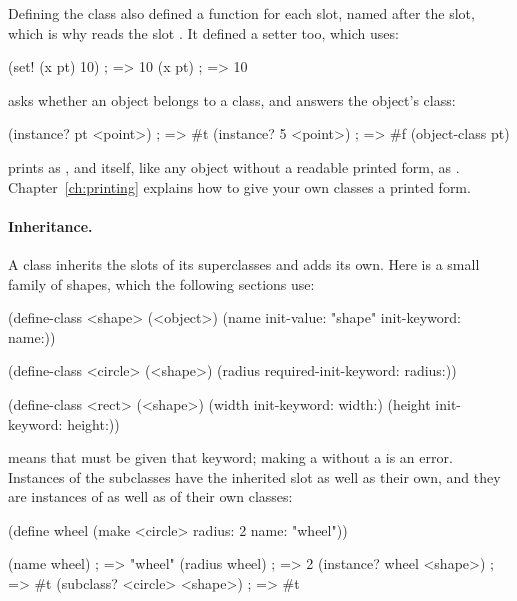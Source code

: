 Defining the class also defined a  function for each slot,
named after the slot, which is why  reads the slot .
It defined a setter too, which  uses:

\begin{dylan}
(set! (x pt) 10)                ; => 10
(x pt)                          ; => 10
\end{dylan}

 asks whether an object belongs to a class, and
 answers the object's class:

\begin{dylan}
(instance? pt <point>)          ; => #t
(instance? 5 <point>)           ; => #f
(object-class pt)
\end{dylan}

 prints as , and
 itself, like any object without a readable printed form, as
. Chapter~\ref{ch:printing} explains how
to give your own classes a printed form.

\paragraph{Inheritance.} A class inherits the slots of its superclasses
and adds its own. Here is a small family of shapes, which the following
sections use:

\begin{dylan}
(define-class <shape> (<object>)
  (name init-value: "shape" init-keyword: name:))

(define-class <circle> (<shape>)
  (radius required-init-keyword: radius:))

(define-class <rect> (<shape>)
  (width  init-keyword: width:)
  (height init-keyword: height:))
\end{dylan}

 means that  must be given that
keyword; making a  without a  is an error.
Instances of the subclasses have the inherited  slot as well
as their own, and they are instances of  as well as of their
own classes:

\begin{dylan}
(define wheel (make <circle> radius: 2 name: "wheel"))

(name wheel)                    ; => "wheel"
(radius wheel)                  ; => 2
(instance? wheel <shape>)       ; => #t
(subclass? <circle> <shape>)    ; => #t
\end{dylan}

